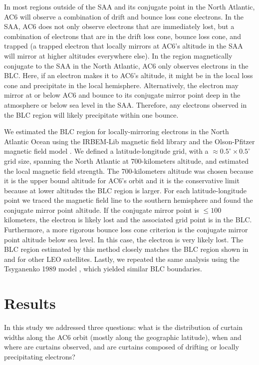 \documentclass[draft]{agujournal2019}
\begin{document}
In most regions outside of the SAA and its conjugate point in the North Atlantic, AC6 will observe a combination of drift and bounce loss cone electrons. In the SAA, AC6 does not only observe electrons that are immediately lost, but a combination of electrons that are in the drift loss cone, bounce loss cone, and trapped (a trapped electron that locally mirrors at AC6's altitude in the SAA will mirror at higher altitudes everywhere else). In the region magnetically conjugate to the SAA in the North Atlantic, AC6 only observes electrons in the BLC. Here, if an electron makes it to AC6's altitude, it might be in the local loss cone and precipitate in the local hemisphere. Alternatively, the electron may mirror at or below AC6 and bounce to its conjugate mirror point deep in the atmosphere or below sea level in the SAA. Therefore, any electrons observed in the BLC region will likely precipitate within one bounce.

We estimated the BLC region for locally-mirroring electrons in the North Atlantic Ocean using the IRBEM-Lib magnetic field library and the Olson-Pfitzer magnetic field model \cite{irbem, Olson1982}. We defined a latitude-longitude grid, with a $\approx 0.5^\circ \times 0.5^\circ$ grid size, spanning the North Atlantic at 700-kilometers altitude, and estimated the local magnetic field strength. The 700-kilometers altitude was chosen because it is the upper bound altitude for AC6's orbit and it is the conservative limit because at lower altitudes the BLC region is larger. For each latitude-longitude point we traced the magnetic field line to the southern hemisphere and found the conjugate mirror point altitude. If the conjugate mirror point is $\leq 100$ kilometers, the electron is likely lost and the associated grid point is in the BLC. Furthermore, a more rigorous bounce loss cone criterion is the conjugate mirror point altitude below sea level. In this case, the electron is very likely lost. The BLC region estimated by this method closely matches the BLC region shown in  and  for other LEO satellites. Lastly, we repeated the same analysis using the Tsyganenko 1989 model \cite{Tsyganenko1989}, which yielded similar BLC boundaries.

\section{Results} \label{results}
In this study we addressed three questions: what is the distribution of curtain widths along the AC6 orbit (mostly along the geographic latitude), when and where are curtains observed, and are curtains composed of drifting or locally precipitating electrons?
\end{document}

